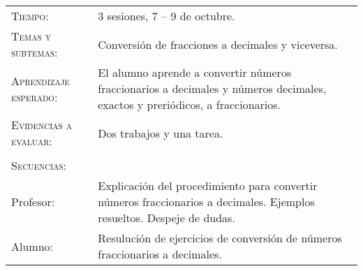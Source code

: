 \documentclass[letterpaper,10pt]{article}
\begin{document}
\begin{tabular}[t]{R{0.25\textwidth}p{0.71\textwidth}}
    \textsc{Tiempo:}                   & 3 sesiones, 7 -- 9 de octubre. \\
    \textsc{Temas y subtemas:}         & Conversi\'on de fracciones a decimales y viceversa. \\
    \textsc{Aprendizaje esperado: }    & El alumno aprende a convertir n\'umeros
    fraccionarios a decimales y n\'umeros decimales, exactos y preri\'odicos, a
    fraccionarios. \\
    \textsc{Evidencias a evaluar:}      & Dos trabajos y una tarea. \\\\
    \textsc{\large Secuencias:} \\
    Profesor: & Explicaci\'on del procedimiento para convertir n\'umeros
    fraccionarios a decimales. Ejemplos resueltos. Despeje de dudas. \\ Alumno:
    & Resuluci\'on de ejercicios de conversi\'on de n\'umeros fraccionarios a
    decimales. \\ 

\end{tabular}
\end{document}
